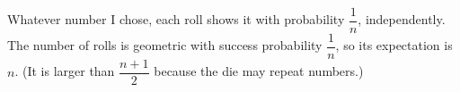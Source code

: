 Whatever number I chose, each roll shows it with probability $\dfrac{1}{n}$, independently. The number of rolls is geometric with success probability $\dfrac{1}{n}$, so its expectation is $\boxed{n}$. (It is larger than $\dfrac{n+1}{2}$ because the die may repeat numbers.)
